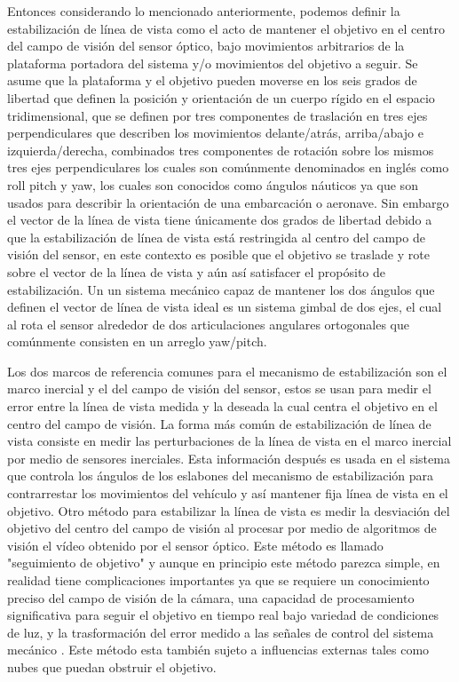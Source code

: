 Entonces considerando lo mencionado anteriormente, podemos definir la estabilizaci\'{o}n de l\'{i}nea de vista como el acto de mantener el objetivo en el centro del campo de visi\'{o}n del sensor \'{o}ptico, bajo movimientos arbitrarios de la plataforma portadora del sistema y/o movimientos del objetivo a seguir. Se asume que la plataforma y el objetivo pueden moverse en los seis grados de libertad que definen la posici\'{o}n y orientaci\'{o}n de un cuerpo r\'{i}gido en el espacio tridimensional, que se definen por tres componentes de traslaci\'{o}n en tres ejes perpendiculares que describen los movimientos delante/atr\'{a}s, arriba/abajo e izquierda/derecha, combinados tres componentes de rotaci\'{o}n sobre los mismos tres ejes perpendiculares los cuales son com\'{u}nmente denominados en ingl\'{e}s como roll pitch y yaw, los cuales son conocidos como \'{a}ngulos n\'{a}uticos ya que son usados para describir la orientaci\'{o}n de una embarcaci\'{o}n o aeronave. Sin embargo el vector de la l\'{i}nea de vista tiene \'{u}nicamente dos grados de libertad debido a que la estabilizaci\'{o}n de l\'{i}nea de vista est\'{a} restringida al centro del campo de visi\'{o}n del sensor, en este contexto es posible que el objetivo se traslade y rote sobre el vector de la l\'{i}nea de vista y a\'{u}n as\'{i} satisfacer el prop\'{o}sito de estabilizaci\'{o}n. Un un sistema mec\'{a}nico capaz de mantener los dos \'{a}ngulos que definen el vector de l\'{i}nea de vista ideal es un sistema gimbal de dos ejes, el cual al rota el sensor alrededor de dos articulaciones angulares ortogonales que com\'{u}nmente consisten en un arreglo yaw/pitch.

Los dos marcos de referencia comunes para el mecanismo de estabilizaci\'{o}n son el marco inercial y el del campo de visi\'{o}n del sensor, estos se usan para medir el error entre la l\'{i}nea de vista medida y la deseada la cual centra el objetivo en el centro del campo de visi\'{o}n. La forma m\'{a}s com\'{u}n de estabilizaci\'{o}n de l\'{i}nea de vista consiste en medir las perturbaciones de la l\'{i}nea de vista en el marco inercial por medio de sensores inerciales. Esta informaci\'{o}n despu\'{e}s es usada en el sistema que controla los \'{a}ngulos de los eslabones del mecanismo de estabilizaci\'{o}n  para contrarrestar los movimientos del veh\'{i}culo y as\'{i} mantener fija l\'{i}nea de vista en el objetivo. Otro m\'{e}todo para estabilizar la l\'{i}nea de vista es medir la desviaci\'{o}n del objetivo del centro del campo de visi\'{o}n al procesar por medio de algoritmos de visi\'{o}n el v\'{i}deo obtenido por el sensor \'{o}ptico. Este m\'{e}todo es llamado "seguimiento de objetivo" y aunque en principio este m\'{e}todo parezca simple, en realidad tiene complicaciones importantes ya que se requiere un conocimiento preciso del campo de visi\'{o}n de la c\'{a}mara, una capacidad de procesamiento significativa para seguir el objetivo en tiempo real bajo variedad de condiciones de luz, y la trasformaci\'{o}n del error medido a las se\~{n}ales de control del sistema mec\'{a}nico \cite{26}. Este m\'{e}todo esta tambi\'{e}n sujeto a influencias externas tales como nubes que puedan obstruir el objetivo.

